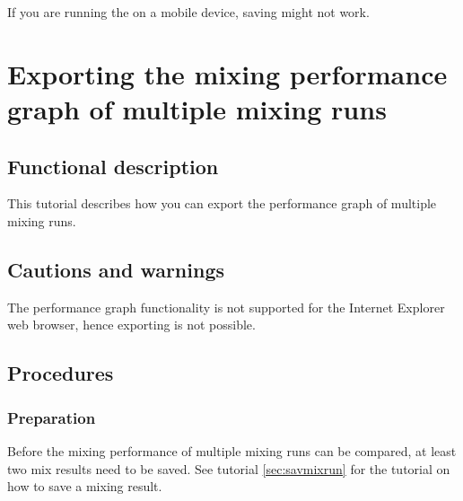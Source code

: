 If you are running the \applicationname{} on a mobile device, saving might not work.


\section{Exporting the mixing performance graph of multiple mixing runs}
\label{sec:exportMultiGraph}

\subsection{Functional description}
This tutorial describes how you can export the performance graph of multiple mixing runs.

\subsection{Cautions and warnings}
The performance graph functionality is not supported for the Internet Explorer web browser, hence exporting is not possible.

\subsection{Procedures}
\subsubsection{Preparation}
Before the mixing performance of multiple mixing runs can be compared, at least two mix results need to be saved. See tutorial \ref{sec:savmixrun} for the tutorial on how to save a mixing result.

